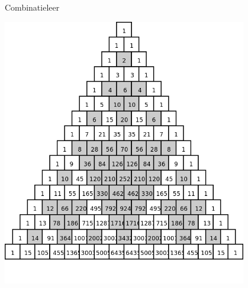 \documentclass[12pt,twoside]{article}
\begin{document}
\pagestyle{fancy}
\lhead{}

\begin{theorie}

\thispagestyle{empty}
\begin{center}
  \begin{mdframed}
  \centering
  \fontsize{40}{60}\selectfont Combinatieleer
  \end{mdframed}
  \vfill
  \includegraphics[width=0.8\textwidth]{PascalWithEvenNumbers}
  \vfill
\end{center}

\end{theorie}
\end{document}
